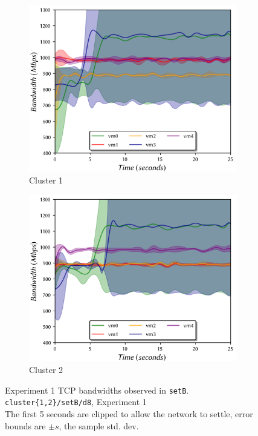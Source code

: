 \documentclass[a4paper,10pt]{article}
\begin{document}
\begin{figure}
    \centering
    \begin{subfigure}{.45\textwidth}
      \centering
      \includegraphics[width=\hsize]{figs/cluster1/setB/vis-3-0.png}
      \vspace{-5mm}
      \caption{Cluster 1}
    \end{subfigure}%
    \hfill
    \begin{subfigure}{.45\textwidth}
      \centering
      \includegraphics[width=\hsize]{figs/cluster2/setB/vis-3-0.png}
      \vspace{-5mm}
      \caption{Cluster 2}
    \end{subfigure}%
    \caption{\centering{} Experiment 1 TCP bandwidths observed in \texttt{setB}. \\ \texttt{cluster\{1,2\}/setB/d8}, Experiment 1 \\ The first 5 seconds are clipped to allow the network to settle, error bounds are $\pm s$, the sample std. dev.}
    \label{fig:temp-bw-tcp}
\end{figure}
\end{document}
